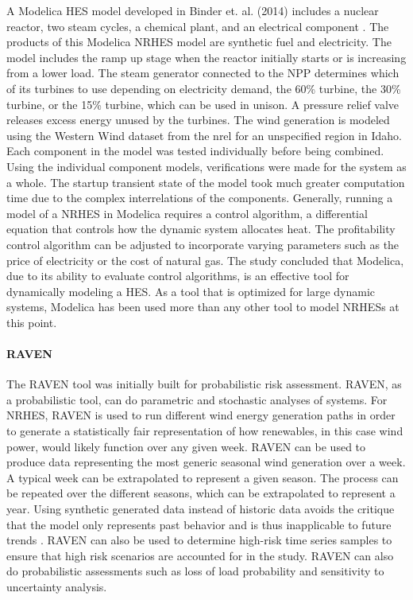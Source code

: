 A Modelica HES model developed in Binder et. al. (2014) includes a nuclear reactor, two steam cycles, a chemical plant, and an electrical component \cite{Binder2014}. The products of this Modelica NRHES model are synthetic fuel and electricity. The model includes the ramp up stage when the reactor initially starts or is increasing from a lower load. The steam generator connected to the NPP determines which of its turbines to use depending on electricity demand, the 60\% turbine, the 30\% turbine, or the 15\% turbine, which can be used in unison. A pressure relief valve releases excess energy unused by the turbines. The wind generation is modeled using the Western Wind dataset from the \ac{nrel} for an unspecified region in Idaho. Each component in the model was tested individually before being combined. Using the individual component models, verifications were made for the system as a whole. The startup transient state of the model took much greater computation time due to the complex interrelations of the components. Generally, running a model of a NRHES in Modelica requires a control algorithm, a differential equation that controls how the dynamic system allocates heat. The profitability control algorithm can be adjusted to incorporate varying parameters such as the price of electricity or the cost of natural gas. The study concluded that Modelica, due to its ability to evaluate control algorithms, is an effective tool for dynamically modeling a HES. As a tool that is optimized for large dynamic systems, Modelica has been used more than any other tool to model NRHESs at this point.

\paragraph{RAVEN}


The RAVEN tool was initially built for probabilistic risk assessment. RAVEN, as a probabilistic tool, can do parametric and stochastic analyses of systems\cite{RabitiRAVEN}. For NRHES, RAVEN is used to run different wind energy generation paths in order to generate a statistically fair representation of how renewables, in this case wind power, would likely function over any given week. RAVEN can be used to produce data representing the most generic seasonal wind generation over a week. A typical week can be extrapolated to represent a given season. The process can be repeated over the different seasons, which can be extrapolated to represent a year. Using synthetic generated data instead of historic data avoids the critique that the model only represents past behavior and is thus inapplicable to future trends \cite{redfoot_epiney_2016}. RAVEN can also be used to determine high-risk time series samples to ensure that high risk scenarios are accounted for in the study. RAVEN can also do probabilistic assessments such as loss of load probability and sensitivity to uncertainty analysis.

